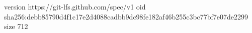 version https://git-lfs.github.com/spec/v1
oid sha256:debb85790d4f1c17e2d4088cadbb9dc98fe182af46b255c3bc77bf7e07de2299
size 712
